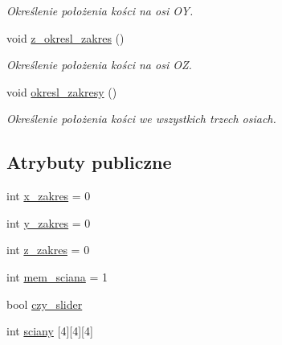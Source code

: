\begin{DoxyCompactItemize}
\begin{DoxyCompactList}\small\item\em Określenie położenia kości na osi OY. \end{DoxyCompactList}\item 
void \hyperlink{class_wizualizacja_kosc_a01b68ff7aad0d8170bc675b988b0e2d6}{z\+\_\+okresl\+\_\+zakres} ()
\begin{DoxyCompactList}\small\item\em Określenie położenia kości na osi OZ. \end{DoxyCompactList}\item 
void \hyperlink{class_wizualizacja_kosc_af65c8f14882161876dad59a3d0e754c2}{okresl\+\_\+zakresy} ()
\begin{DoxyCompactList}\small\item\em Określenie położenia kości we wszystkich trzech osiach. \end{DoxyCompactList}\end{DoxyCompactItemize}
\subsection*{Atrybuty publiczne}
\begin{DoxyCompactItemize}
\item 
int \hyperlink{class_wizualizacja_kosc_aba059f3a46ffb74158786d2e74f34c94}{x\+\_\+zakres} = 0
\item 
int \hyperlink{class_wizualizacja_kosc_a61ee2d767b712866f93710c29cdd051d}{y\+\_\+zakres} = 0
\item 
int \hyperlink{class_wizualizacja_kosc_abec9f7c00196751f1f97e8845a9c7d21}{z\+\_\+zakres} = 0
\item 
int \hyperlink{class_wizualizacja_kosc_a2b489f7583deecf0d6b74ac0771e2ec2}{mem\+\_\+sciana} = 1
\item 
bool \hyperlink{class_wizualizacja_kosc_a25d14786810ffb0496b4cd8492fcb03f}{czy\+\_\+slider}
\item 
int \hyperlink{class_wizualizacja_kosc_a6565d01127ba28bc5c708b248881dec2}{sciany} \mbox{[}4\mbox{]}\mbox{[}4\mbox{]}\mbox{[}4\mbox{]}
\end{DoxyCompactItemize}
